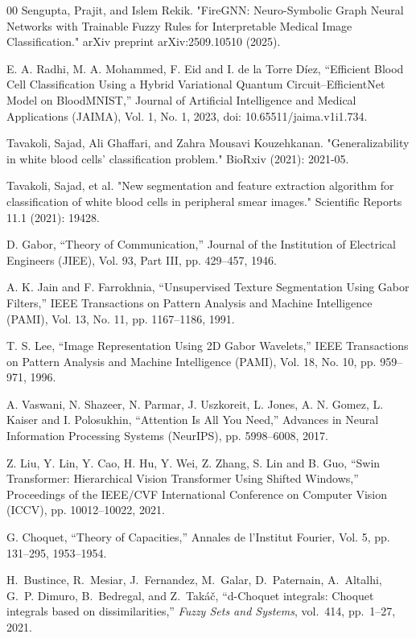 \documentclass[12pt]{article}
\begin{document}
\begin{thebibliography}{00}
Sengupta, Prajit, and Islem Rekik. "FireGNN: Neuro-Symbolic Graph Neural Networks with Trainable Fuzzy Rules for Interpretable Medical Image Classification." arXiv preprint arXiv:2509.10510 (2025).

E. A. Radhi, M. A. Mohammed, F. Eid and I. de la Torre Díez,
``Efficient Blood Cell Classification Using a Hybrid Variational Quantum Circuit–EfficientNet Model on BloodMNIST,''
Journal of Artificial Intelligence and Medical Applications (JAIMA),
Vol. 1, No. 1, 2023, doi: 10.65511/jaima.v1i1.734.

Tavakoli, Sajad, Ali Ghaffari, and Zahra Mousavi Kouzehkanan. "Generalizability in white blood cells’ classification problem." BioRxiv (2021): 2021-05.

Tavakoli, Sajad, et al. "New segmentation and feature extraction algorithm for classification of white blood cells in peripheral smear images." Scientific Reports 11.1 (2021): 19428.

D. Gabor,
``Theory of Communication,''
Journal of the Institution of Electrical Engineers (JIEE), Vol. 93, Part III, pp. 429--457, 1946.

A. K. Jain and F. Farrokhnia,
``Unsupervised Texture Segmentation Using Gabor Filters,''
IEEE Transactions on Pattern Analysis and Machine Intelligence (PAMI),
Vol. 13, No. 11, pp. 1167--1186, 1991.

T. S. Lee,
``Image Representation Using 2D Gabor Wavelets,''
IEEE Transactions on Pattern Analysis and Machine Intelligence (PAMI),
Vol. 18, No. 10, pp. 959--971, 1996.

A. Vaswani, N. Shazeer, N. Parmar, J. Uszkoreit, L. Jones, A. N. Gomez, 
L. Kaiser and I. Polosukhin,
``Attention Is All You Need,''
Advances in Neural Information Processing Systems (NeurIPS),
pp. 5998--6008, 2017.

Z. Liu, Y. Lin, Y. Cao, H. Hu, Y. Wei, Z. Zhang, S. Lin and B. Guo,
``Swin Transformer: Hierarchical Vision Transformer Using Shifted Windows,''
Proceedings of the IEEE/CVF International Conference on Computer Vision (ICCV),
pp. 10012--10022, 2021.

G. Choquet,
``Theory of Capacities,''
Annales de l’Institut Fourier,
Vol. 5, pp. 131--295, 1953--1954.

H.~Bustince, R.~Mesiar, J.~Fernandez, M.~Galar, D.~Paternain, A.~Altalhi, G.~P. Dimuro, B.~Bedregal, and Z.~Takáč,
``d-Choquet integrals: Choquet integrals based on dissimilarities,''
\emph{Fuzzy Sets and Systems}, vol.~414, pp.~1--27, 2021.


\end{thebibliography}
\end{document}
